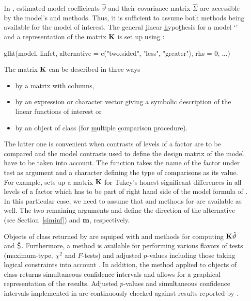 \documentclass[12pt]{article}
\begin{document}
In \RR, estimated model coefficients $\hat{\vartheta}$ and their covariance 
matrix $\hat{\Sigma}$ are accessible by the model's  
and  methods. Thus, it is sufficient to assume both
methods being available for the model of interest. The \underline{g}eneral
\underline{l}inear \underline{h}ypo\underline{t}hesis for a model 
`' and a representation of the matrix $\K$
is set up using :
\begin{Sinput}
glht(model, linfct, alternative = c("two.sided", "less", "greater"), 
     rhs = 0, ...)
\end{Sinput}
The matrix $\K$ can be described in three ways
\begin{itemize}
\item by a matrix with  columns,
\item by an expression or character vector giving a symbolic description 
      of the linear functions of interest or
\item by an object of class  
      (for \underline{m}ultiple \underline{c}omparison \underline{p}rocedure).
\end{itemize}
The latter one is convenient when contrasts of levels of a factor are
to be compared and the model contrasts used to define the design matrix
of the model have to be taken into account. The  function
takes the name of the factor under test as argument and a character 
defining the type of comparisons as its value. For example,
 sets up a matrix $\K$ for Tukey's honest
significant differences in all levels of a factor 
which has to be part of right hand side of the model formula
of . In this particular case, we need to assume
that  and  methods for 
 are available as well. The two remaining arguments
 and  define the direction
of the alternative (see Section~\ref{siminf}) and $\m$, respectively.

Objects of class  returned by  are equiped with
 and  methods for computing
$\K \hat{\vartheta}$ and $\hat{\S}$. Furthermore, a  method
is available for performing various flavors of tests (maximum-type, $\chi^2$ and 
$F$-tests) and adjusted $p$-values including those taking 
logical constraints into account \citep{Shaffer1986, Westfall1997}.
In addition, the  method applied to objects of class 
 returns simultaneous confidence intervals and allows
for a graphical representation of the results. Adjusted $p$-values and
simultaneous confidence intervals implemented in 
are continuously checked against results reported by
\cite{Westfall1999}.
\end{document}
